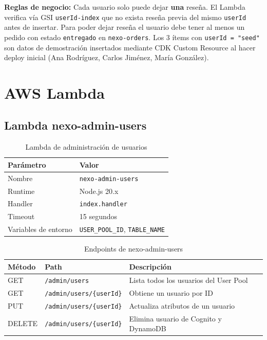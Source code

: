 \documentclass[12pt,a4paper]{article}
\begin{document}
\begin{nexobox}
\textbf{Reglas de negocio:} Cada usuario solo puede dejar \textbf{una} reseña.
El Lambda verifica vía GSI \texttt{userId-index} que no exista reseña previa del mismo
\texttt{userId} antes de insertar. Para poder dejar reseña el usuario debe tener al
menos un pedido con estado \texttt{entregado} en \texttt{nexo-orders}.
Los 3 ítems con \texttt{userId = "seed"} son datos de demostración insertados mediante
CDK Custom Resource al hacer deploy inicial (Ana Rodríguez, Carlos Jiménez, María González).
\end{nexobox}

\section{AWS Lambda}

\subsection{Lambda nexo-admin-users}

\begin{table}[H]
\centering
\begin{tabular}{@{}ll@{}}
\toprule
\textbf{Parámetro} & \textbf{Valor} \\
\midrule
Nombre & \texttt{nexo-admin-users} \\
Runtime & Node.js 20.x \\
Handler & \texttt{index.handler} \\
Timeout & 15 segundos \\
Variables de entorno & \texttt{USER\_POOL\_ID}, \texttt{TABLE\_NAME} \\
\bottomrule
\end{tabular}
\caption{Lambda de administración de usuarios}
\end{table}

\begin{table}[H]
\centering
\begin{tabular}{@{}lll@{}}
\toprule
\textbf{Método} & \textbf{Path} & \textbf{Descripción} \\
\midrule
GET & \texttt{/admin/users} & Lista todos los usuarios del User Pool \\
GET & \texttt{/admin/users/\{userId\}} & Obtiene un usuario por ID \\
PUT & \texttt{/admin/users/\{userId\}} & Actualiza atributos de un usuario \\
DELETE & \texttt{/admin/users/\{userId\}} & Elimina usuario de Cognito y DynamoDB \\
\bottomrule
\end{tabular}
\caption{Endpoints de nexo-admin-users}
\end{table}
\end{document}
